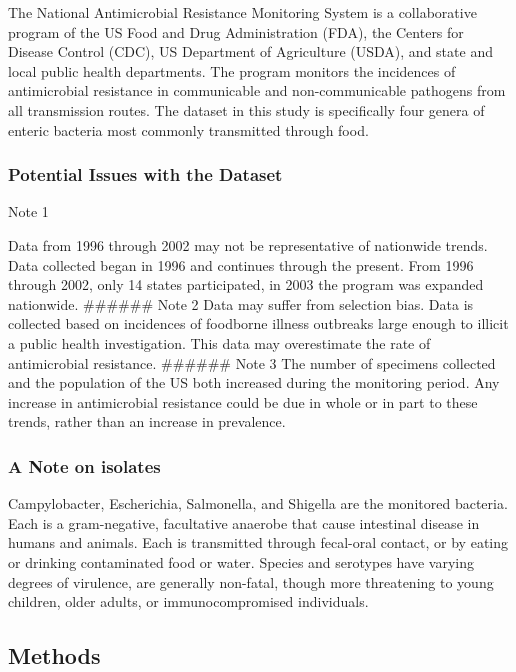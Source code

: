 \documentclass[11pt]{article}
\begin{document}
The National Antimicrobial Resistance Monitoring System is a
collaborative program of the US Food and Drug Administration (FDA), the
Centers for Disease Control (CDC), US Department of Agriculture (USDA),
and state and local public health departments. The program monitors the
incidences of antimicrobial resistance in communicable and
non-communicable pathogens from all transmission routes. The dataset in
this study is specifically four genera of enteric bacteria most commonly
transmitted through food.

    \hypertarget{potential-issues-with-the-dataset}{%
\subsubsection{Potential Issues with the
Dataset}\label{potential-issues-with-the-dataset}}

Note 1

Data from 1996 through 2002 may not be representative of nationwide
trends. Data collected began in 1996 and continues through the present.
From 1996 through 2002, only 14 states participated, in 2003 the program
was expanded nationwide. \#\#\#\#\#\# Note 2 Data may suffer from
selection bias. Data is collected based on incidences of foodborne
illness outbreaks large enough to illicit a public health investigation.
This data may overestimate the rate of antimicrobial resistance.
\#\#\#\#\#\# Note 3 The number of specimens collected and the population
of the US both increased during the monitoring period. Any increase in
antimicrobial resistance could be due in whole or in part to these
trends, rather than an increase in prevalence.

    \hypertarget{a-note-on-isolates}{%
\subsubsection{A Note on isolates}\label{a-note-on-isolates}}

Campylobacter, Escherichia, Salmonella, and Shigella are the monitored
bacteria. Each is a gram-negative, facultative anaerobe that cause
intestinal disease in humans and animals. Each is transmitted through
fecal-oral contact, or by eating or drinking contaminated food or water.
Species and serotypes have varying degrees of virulence, are generally
non-fatal, though more threatening to young children, older adults, or
immunocompromised individuals.

    \hypertarget{methods}{%
\subsection{Methods}\label{methods}}
\end{document}

